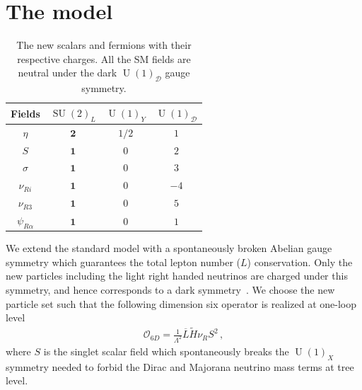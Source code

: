 \documentclass[12pt]{article}
\begin{document}
\section{The model}
\label{sec:Model}
%
\begin{table}[t!]
  \centering
  \begin{tabular}{|c|c|c|c|}
    \hline  
    Fields     & $\operatorname{SU}(2)_L$ & $\operatorname{U}(1)_Y $ & $\operatorname{U}(1)_{\mathcal{D}}$ \\ \hline
    $\eta$  & $\boldsymbol{2}$ & $1/2$  & $1$ \\
    $S$ & $\boldsymbol{1}$ & $0$  & $2$ \\
    $\sigma$ & $\boldsymbol{1}$ & $0$ & $3$ \\
    \hline
    $\nu_{Ri}$ & $\boldsymbol{1}$ & $0$ & $-4$\\
    $\nu_{R3}$ & $\boldsymbol{1}$ & $0$ & $5$\\
    $\psi_{R\alpha}$  & $\boldsymbol{1}$ & 0 & $1$ \\\hline
  \end{tabular}
  \caption{The new scalars and fermions with their respective charges. All the SM fields are neutral under the dark $\operatorname{U}(1)_{\mathcal{D}}$ gauge symmetry. }
    \label{tab:partcont}
\end{table}
%
We extend the standard model with a spontaneously broken Abelian gauge symmetry  which guarantees the total lepton number ($L$) conservation. Only the new particles including the light right handed neutrinos are charged under this symmetry, and hence corresponds to a dark symmetry~\cite{1807.09877}. We choose the new particle set such that the following dimension six operator is realized at one-loop level
\begin{align}
  \label{eq:ld6}
  \mathcal{O}_{6D}=\frac{1}{\Lambda^2} \overline{L} \tilde{H} \nu_R S^2\,,
\end{align}
where $S$ is the singlet scalar field which spontaneously breaks the $\operatorname{U}(1)_X$ symmetry needed to forbid the Dirac and Majorana neutrino mass terms at tree level.
\end{document}
